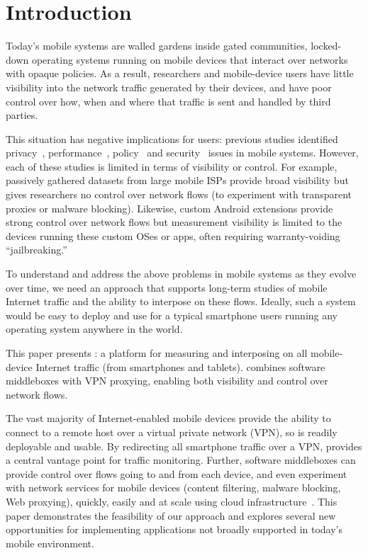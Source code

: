 \section{Introduction}
\label{sec:introduction}

Today's mobile systems are walled gardens inside gated communities, \ie{} locked-down operating systems 
running on mobile devices that interact over networks with opaque policies. As a result, 
researchers and mobile-device users have little visibility into the network traffic generated by 
their devices, and have poor control over how, when and where that traffic is sent and handled by third parties. 

This situation has negative implications for users: previous studies  
identified privacy~\cite{vallina-rod:ads}, performance~\cite{gerber:passivespeed,chen:wifi,sommers:cellwifi}, policy~\cite{wang:middleboxes} and security~\cite{enck:taintdroid} issues in mobile systems. However, each of these studies 
is limited in terms of visibility or control. 
For example, passively gathered datasets from large mobile 
ISPs provide broad visibility but gives researchers no control over network flows (\eg to experiment with 
transparent proxies or malware blocking). Likewise, custom Android extensions provide 
strong control over network flows but measurement visibility is limited to the devices running these 
custom OSes or apps, often requiring warranty-voiding ``jailbreaking.'' 

To understand and address the above problems in mobile systems as they evolve over time, we 
need an approach that supports long-term studies of mobile Internet traffic and the ability to 
interpose on these flows. 
Ideally, such a system would be easy to deploy and use for a typical smartphone users 
running any operating system anywhere in the world.

This paper presents \meddle:  a platform for measuring and interposing on all mobile-device 
Internet traffic (\eg from smartphones and tablets). \meddle combines software middleboxes 
with VPN proxying, enabling both visibility and control over network flows. 

The vast majority of Internet-enabled mobile devices provide the ability to connect to a remote 
host over a virtual private network (VPN), so \meddle is readily deployable and usable. 
By redirecting all smartphone traffic over a VPN, \meddle provides a central vantage point for traffic monitoring.
Further, software middleboxes can provide control over flows going to and from each device, and even experiment 
with network services for mobile devices (\eg content filtering, malware blocking, Web proxying), quickly, easily and at scale using cloud infrastructure~\cite{sherry:middleboxes}. 
This paper demonstrates the feasibility of our approach and explores several new opportunities 
for implementing applications not broadly supported in today's mobile 
environment. 

